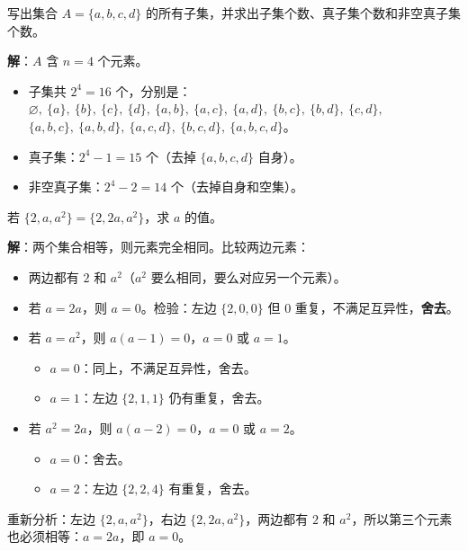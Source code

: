 \documentclass[12pt, a4paper]{ctexart}
\begin{document}
\begin{examplebox}[【例2】子集与真子集个数]
写出集合 $A = \{a, b, c, d\}$ 的所有子集，并求出子集个数、真子集个数和非空真子集个数。
\end{examplebox}

\textbf{解}：$A$ 含 $n = 4$ 个元素。
\begin{itemize}[leftmargin=2em]
  \item 子集共 $2^4 = 16$ 个，分别是：\\
    $\varnothing,\ \{a\},\ \{b\},\ \{c\},\ \{d\},\ \{a,b\},\ \{a,c\},\ \{a,d\},\ \{b,c\},\ \{b,d\},\ \{c,d\},$\\
    $\{a,b,c\},\ \{a,b,d\},\ \{a,c,d\},\ \{b,c,d\},\ \{a,b,c,d\}$。
  \item 真子集：$2^4 - 1 = 15$ 个（去掉 $\{a,b,c,d\}$ 自身）。
  \item 非空真子集：$2^4 - 2 = 14$ 个（去掉自身和空集）。
\end{itemize}

\begin{examplebox}[【例3】集合相等]
若 $\{2, a, a^2\} = \{2, 2a, a^2\}$，求 $a$ 的值。
\end{examplebox}

\textbf{解}：两个集合相等，则元素完全相同。比较两边元素：
\begin{itemize}[leftmargin=2em]
  \item 两边都有 $2$ 和 $a^2$（$a^2$ 要么相同，要么对应另一个元素）。
  \item 若 $a = 2a$，则 $a = 0$。检验：左边 $\{2, 0, 0\}$ 但 $0$ 重复，不满足互异性，\textbf{舍去}。
  \item 若 $a = a^2$，则 $a(a-1) = 0$，$a = 0$ 或 $a = 1$。
    \begin{itemize}
      \item $a = 0$：同上，不满足互异性，舍去。
      \item $a = 1$：左边 $\{2, 1, 1\}$ 仍有重复，舍去。
    \end{itemize}
  \item 若 $a^2 = 2a$，则 $a(a-2) = 0$，$a = 0$ 或 $a = 2$。
    \begin{itemize}
      \item $a = 0$：舍去。
      \item $a = 2$：左边 $\{2, 2, 4\}$ 有重复，舍去。
    \end{itemize}
\end{itemize}
重新分析：左边 $\{2, a, a^2\}$，右边 $\{2, 2a, a^2\}$，两边都有 $2$ 和 $a^2$，所以第三个元素也必须相等：$a = 2a$，即 $a = 0$。
\end{document}
